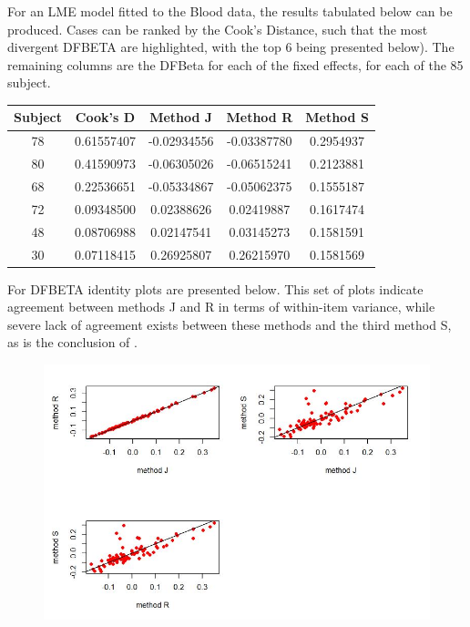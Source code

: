 \documentclass[12pt, a4paper]{report}
\theoremstyle{plain}
\theoremstyle{definition}
\theoremstyle{remark}
\begin{document}
	For an LME model fitted to the Blood data, the results tabulated below can be produced.  Cases can be ranked by the Cook's Distance, such that the most divergent DFBETA are highlighted, with the top 6 being presented below). The remaining columns are the DFBeta for each of the fixed effects, for each of the 85 subject.
	\begin{center}
		\begin{tabular}{|c|c|c|c|c|} \hline
			Subject &    Cook's D  &    Method J  &   Method R  & Method S \\ \hline \hline
			78 & 0.61557407 & -0.02934556 & -0.03387780 & 0.2954937  \\ \hline
			80 & 0.41590973 & -0.06305026 & -0.06515241 & 0.2123881  \\ \hline
			68 & 0.22536651 & -0.05334867 & -0.05062375 & 0.1555187  \\ \hline
			72 & 0.09348500  & 0.02388626  & 0.02419887 & 0.1617474  \\ \hline
			48 & 0.08706988  & 0.02147541  & 0.03145273 & 0.1581591  \\ \hline
			30 & 0.07118415  & 0.26925807  & 0.26215970 & 0.1581569  \\ \hline
		\end{tabular}
	\end{center}
	For DFBETA identity plots are presented below. This set of plots indicate agreement between methods J and R in terms of within-item variance, while severe lack of agreement exists between these methods and the third method S, as is the conclusion of \citet{ARoy2009}.	
	\begin{figure}[h!]
		\centering
		\includegraphics[width=1\linewidth]{images/04-DFbetaplots}
	\end{figure}
	
\end{document}
